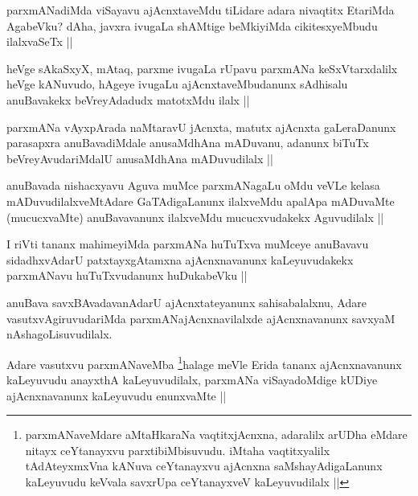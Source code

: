 \begin{artha}
parxmANadiMda viSayavu ajAcnxtaveMdu tiLidare adara nivaqtitx EtariMda AgabeVku? dAha, javxra ivugaLa shAMtige beMkiyiMda cikitesxyeMbudu ilalxvaSeTx ||
\end{artha}

\begin{artha}
heVge sAkaSxyX, mAtaq, parxme ivugaLa rUpavu parxmANa keSxVtarxdalilx heVge kANuvudo, hAgeye ivugaLu ajAcnxtaveMbudanunx sAdhisalu anuBavakekx beVreyAdadudx matotxMdu ilalx ||
\end{artha}

\begin{artha}
parxmANa vAyxpArada naMtaravU jAcnxta, matutx ajAcnxta gaLeraDanunx parasapxra anuBavadiMdale anusaMdhAna mADuvanu, adanunx biTuTx beVreyAvudariMdalU anusaMdhAna mADuvudilalx ||
\end{artha}

\begin{artha}
anuBavada nishacxyavu Aguva muMce parxmANagaLu oMdu veVLe kelasa mADuvudilalxveMtAdare GaTAdigaLanunx ilalxveMdu apalApa mADuvaMte (mucucxvaMte) anuBavavanunx ilalxveMdu mucucxvudakekx Aguvudilalx ||
\end{artha}

\begin{artha}
I riVti tananx mahimeyiMda parxmANa huTuTxva muMceye anuBavavu sidadhxvAdarU patxtayxgAtamxna ajAcnxnavanunx kaLeyuvudakekx parxmANavu huTuTxvudanunx huDukabeVku ||
\end{artha}

\begin{artha}
anuBava savxBAvadavanAdarU ajAcnxtateyanunx sahisabalalxnu, Adare vasutxvAgiruvudariMda parxmANajAcnxnavilalxde ajAcnxnavanunx savxyaM nAshagoLisuvudilalx.
\end{artha}

\begin{artha}
Adare vasutxvu parxmANaveMba \footnote{parxmANaveMdare aMtaHkaraNa vaqtitxjAcnxna, adaralilx arUDha eMdare nitayx ceYtanayxvu parxtibiMbisuvudu. iMtaha vaqtitxyalilx tAdAteyxmxVna kANuva ceYtanayxvu ajAcnxna saMshayAdigaLanunx kaLeyuvudu keVvala savxrUpa ceYtanayxveV kaLeyuvudilalx ||}halage meVle Erida tananx ajAcnxnavanunx kaLeyuvudu anayxthA kaLeyuvudilalx, parxmANa viSayadoMdige kUDiye ajAcnxnavanunx kaLeyuvudu enunxvaMte ||
\end{artha}

